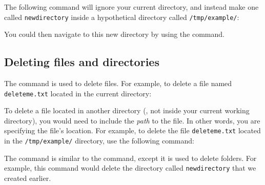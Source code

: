 \begin{terminal}
\prompt {}
\end{terminal}

The following command will ignore your current directory, and instead make one called \texttt{newdirectory} inside a hypothetical directory called \texttt{/tmp/example/}:

\begin{terminal}
\prompt {} 
\end{terminal}

You could then navigate to this new directory by using the  command.

\begin{terminal}
\prompt {}
\end{terminal}

\subsection{Deleting files and directories}

The  command is used to delete files. For example, to delete a file named \texttt{deleteme.txt} located in the current directory:

\begin{terminal}
\prompt {}
\end{terminal}

To delete a file located in another directory (\ie, not inside your current working directory), you would need to include the \emph{path} to the file. In other words, you are specifying the file's location. For example, to delete the file \texttt{deleteme.txt} located in the \texttt{/tmp/example/} directory, use the following command:

\begin{terminal}
\prompt {}
\end{terminal}

The  command is similar to the  command, except it is used to delete folders. For example, this command would delete the directory called \texttt{newdirectory} that we created earlier.

\begin{terminal}
\prompt {}
\end{terminal}

